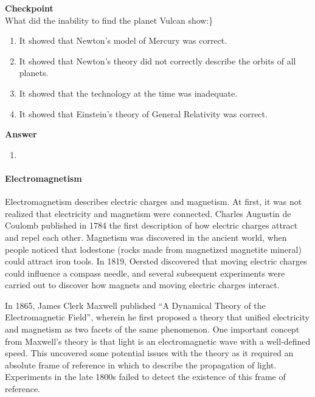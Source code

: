 \begin{framed}
\textbf{Checkpoint}\\
What did the inability to find the planet Vulcan show:\}

\begin{enumerate}
\item It showed that Newton's model of Mercury was correct.
\item It showed that Newton's theory did not correctly describe the orbits of all planets.
\item It showed that the technology at the time was inadequate.
\item It showed that Einstein's theory of General Relativity was correct.
\end{enumerate}

\begin{framed}
\textbf{Answer}\\
\begin{enumerate}[resume]
\item
\end{enumerate}
\end{framed}
\end{framed}

\paragraph{Electromagnetism}

Electromagnetism describes electric charges and magnetism. At first, it was not realized that electricity and magnetism were connected. Charles Augustin de Coulomb published in 1784 the first description of how electric charges attract and repel each other. Magnetism was discovered in the ancient world, when people noticed that lodestone (rocks made from magnetized magnetite mineral) could attract iron tools. In 1819, Oersted discovered that moving electric charges could influence a compass needle, and several subsequent experiments were carried out to discover how magnets and moving electric charges interact.

In 1865, James Clerk Maxwell published ``A Dynamical Theory of the Electromagnetic Field'', wherein he first proposed a theory that unified electricity and magnetism as two facets of the same phenomenon. One important concept from Maxwell's theory is that light is an electromagnetic wave with a well-defined speed. This uncovered some potential issues with the theory as it required an absolute frame of reference in which to describe the propagation of light. Experiments in the late 1800s failed to detect the existence of this frame of reference.

